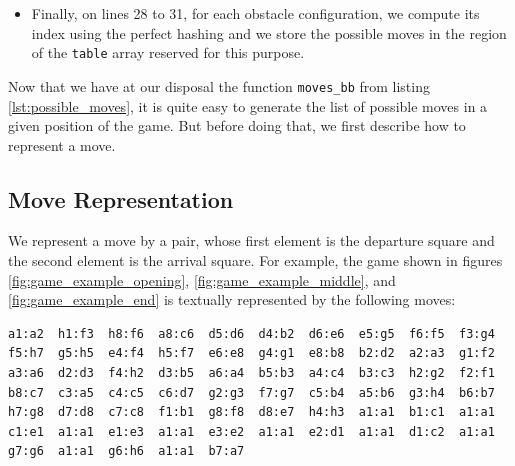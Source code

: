 \documentclass[12pt,a4paper,twoside,openright]{book}
\begin{document}
\begin{itemize}
\item Finally, on lines 28 to 31, for each obstacle configuration, we compute its index using the perfect hashing and we store the possible moves in the region of the \texttt{table} array reserved for this purpose.

\end{itemize}


Now that we have at our disposal the function \texttt{moves_bb} from listing \ref{lst:possible_moves}, it is quite easy to generate the list of possible moves in a given position of the game. But before doing that, we first describe how to represent a move.

\subsection{Move Representation}

We represent a move by a pair, whose first element is the departure square and the second element is the arrival square. For example, the game shown in figures \ref{fig:game_example_opening}, \ref{fig:game_example_middle}, and \ref{fig:game_example_end} is textually represented by the following moves:
\begin{verbatim}
a1:a2  h1:f3  h8:f6  a8:c6  d5:d6  d4:b2  d6:e6  e5:g5  f6:f5  f3:g4
f5:h7  g5:h5  e4:f4  h5:f7  e6:e8  g4:g1  e8:b8  b2:d2  a2:a3  g1:f2
a3:a6  d2:d3  f4:h2  d3:b5  a6:a4  b5:b3  a4:c4  b3:c3  h2:g2  f2:f1
b8:c7  c3:a5  c4:c5  c6:d7  g2:g3  f7:g7  c5:b4  a5:b6  g3:h4  b6:b7
h7:g8  d7:d8  c7:c8  f1:b1  g8:f8  d8:e7  h4:h3  a1:a1  b1:c1  a1:a1
c1:e1  a1:a1  e1:e3  a1:a1  e3:e2  a1:a1  e2:d1  a1:a1  d1:c2  a1:a1
g7:g6  a1:a1  g6:h6  a1:a1  b7:a7
\end{verbatim}
\end{document}
